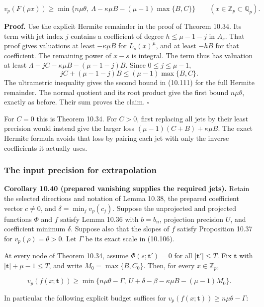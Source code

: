 \documentclass[
  11pt,
  a4paper,
]{article}
\begin{document}
\[
v_p(F(\rho x))\ge
\min\{n\mu\theta,\ \Lambda-\kappa\mu B-(\mu-1)\max\{B,C\}\}
\qquad(x\in\mathbb Z_p\subset\mathbb Q_p).
\tag{10.111}
\]

\textbf{Proof.} Use the explicit Hermite remainder in the proof of
Theorem 10.34. Its term with jet index \(j\) contains a coefficient of
degree \(h\le\mu-1-j\) in \(A_s\). That proof gives valuations at least
\(-\kappa\mu B\) for \(L_s(x)^\mu\), and at least \(-hB\) for that
coefficient. The remaining power of \(x-s\) is integral. The term thus
has valuation at least \(\Lambda-jC-\kappa\mu B-(\mu-1-j)B\). Since
\(0\le j\le\mu-1\), \[
jC+(\mu-1-j)B\le(\mu-1)\max\{B,C\}.
\] The ultrametric inequality gives the second bound in (10.111) for the
full Hermite remainder. The normal quotient and its root product give
the first bound \(n\mu\theta\), exactly as before. Their sum proves the
claim. \(\square\)

For \(C=0\) this is Theorem 10.34. For \(C>0\), first replacing all jets
by their least precision would instead give the larger loss
\((\mu-1)(C+B)+\kappa\mu B\). The exact Hermite formula avoids that loss
by pairing each jet with only the inverse coefficients it actually uses.

\subsubsection{The input precision for
extrapolation}\label{the-input-precision-for-extrapolation}

\textbf{Corollary 10.40 (prepared vanishing supplies the required
jets).} Retain the selected directions and notation of Lemma 10.38, the
prepared coefficient vector \(c\ne0\), and \(\delta=\min_jv_p(c_j)\).
Suppose the unprojected and projected functions \(\Phi\) and \(f\)
satisfy Lemma 10.36 with \(b=b_n\), projection precision \(U\), and
coefficient minimum \(\delta\). Suppose also that the slopes of \(f\)
satisfy Proposition 10.37 for \(v_p(\rho)=\theta>0\). Let \(\Gamma\) be
its exact scale in (10.106).

At every node of Theorem 10.34, assume \(\Phi(s;\boldsymbol t')=0\) for
all \(|\boldsymbol t'|\le T\). Fix \(\boldsymbol t\) with
\(|\boldsymbol t|+\mu-1\le T\), and write \(M_0=\max\{B,C_0\}\). Then,
for every \(x\in\mathbb Z_p\),

\[
v_p(f(x;\boldsymbol t))\ge
\min\{n\mu\theta-\Gamma,\ U+\delta-\beta
-\kappa\mu B-(\mu-1)M_0\}.
\tag{10.112}
\]

In particular the following explicit budget suffices for
\(v_p(f(x;\boldsymbol t))\ge n\mu\theta-\Gamma\):
\end{document}
